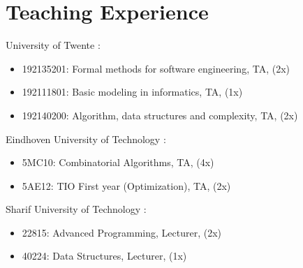 \documentclass[a4paper]{article}
\begin{document}
\section{Teaching Experience}
\begin{CV}
\item [University of Twente]:

\hspace{-2cm}\parbox{\textwidth}{
\begin{itemize}
    \item 192135201: Formal methods for software engineering, TA, (2x)
    \item 192111801: Basic modeling in informatics, TA, (1x)
    \item 192140200: Algorithm, data structures and complexity, TA, (2x)
\end{itemize}}
\item [Eindhoven University of Technology]:

\hspace{-2cm}\parbox{\textwidth}{
\begin{itemize}
    \item 5MC10: Combinatorial Algorithms, TA, (4x)
    \item 5AE12: TIO First year (Optimization), TA, (2x)
\end{itemize}}
\item [Sharif University of Technology]:

\hspace{-2cm}\parbox{\textwidth}{
\begin{itemize}
    \item 22815: Advanced Programming, Lecturer, (2x)
    \item 40224: Data Structures, Lecturer, (1x)
\end{itemize}}
\end{CV}
\end{document}
